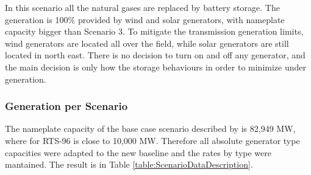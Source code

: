 \documentclass[12pt,LUDisStyle,twosided]{book}
\begin{document}
In this scenario all the natural gases are replaced by battery storage. The generation is 100\% provided by wind and solar generators, with nameplate capacity bigger than Scenario 3. To mitigate the transmission generation limits, wind generators are located all over the field, while solar generators are still located in north east. There is no decision to turn on and off any generator, and the main decision is only how the storage behaviours in order to minimize under generation.

\subsubsection{Generation per Scenario}

The nameplate capacity of the base case scenario described by \citeauthor{shavel} \cite{shavel} is 82,949 MW, where for RTS-96 is close to 10,000 MW. Therefore all absolute generator type capacities were adapted to the new baseline and the rates by type were mantained. The result is in Table \ref{table:ScenarioDataDescription}.
\end{document}
